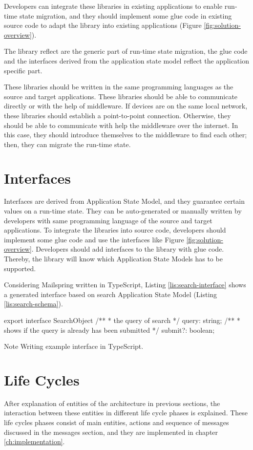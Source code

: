 Developers can integrate these libraries in existing applications to enable run-time state migration, and they should implement some glue code in existing source code to adapt the library into existing applications (Figure \ref{fig:solution-overview}).

The library reflect are the generic part of run-time state migration, the glue code and the interfaces derived from the application state model reflect the application specific part.

These libraries should be written in the same programming languages as the source and target applications. These libraries should be able to communicate directly or with the help of middleware.
If devices are on the same local network, these libraries should establish a point-to-point connection.
Otherwise, they should be able to communicate with help the middleware over the internet.
In this case, they should introduce themselves to the middleware to find each other; then, they can migrate the run-time state.


\section{Interfaces}
Interfaces are derived from Application State Model, and they guarantee certain values on a run-time state. They can be auto-generated or manually written by developers with same programming language of the source and target applications.
To integrate the libraries into source code, developers should implement some glue code and use the interfaces like Figure \ref{fig:solution-overview}. Developers should add interfaces to the library with glue code. Thereby, the library will know which Application State Models has to be supported.

Considering Mailspring written in TypeScript, Listing \ref{lis:search-interface} shows a generated interface based on search Application State Model (Listing \ref{lis:search-schema}).

\FloatBarrier
\begin{code}
\begin{js}
export interface SearchObject {
    /**
     * the query of search
     */
    query: string;
    /**
     * shows if the query is already has been submitted
     */
    submit?: boolean;
}
\end{js}
\caption{Note Writing example interface in TypeScript.}
\label{lis:search-interface}
\end{code}
\FloatBarrier


\section{Life Cycles}
After explanation of entities of the architecture in previous sections, the interaction between these entities in different life cycle phases is explained. These life cycles phases consist of main entities, actions and sequence of messages discussed in the messages section, and they are implemented in chapter \ref{ch:implementation}. 

